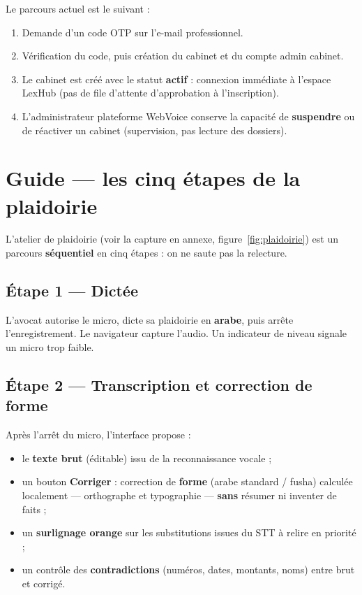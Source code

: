 Le parcours actuel est le suivant :
\begin{enumerate}[leftmargin=1.4em]
  \item Demande d'un code OTP sur l'e-mail professionnel.
  \item Vérification du code, puis création du cabinet et du compte admin cabinet.
  \item Le cabinet est créé avec le statut \textbf{actif} : connexion immédiate à l'espace LexHub (pas de file d'attente d'approbation à l'inscription).
  \item L'administrateur plateforme WebVoice conserve la capacité de \textbf{suspendre} ou de réactiver un cabinet (supervision, pas lecture des dossiers).
\end{enumerate}

\section{Guide --- les cinq étapes de la plaidoirie}
\label{sec:guide}

L'atelier de plaidoirie (voir la capture en annexe, figure~\ref{fig:plaidoirie}) est un parcours \textbf{séquentiel} en cinq étapes : on ne saute pas la relecture.

\subsection{Étape 1 --- Dictée}
L'avocat autorise le micro, dicte sa plaidoirie en \textbf{arabe}, puis arrête l'enregistrement. Le navigateur capture l'audio. Un indicateur de niveau signale un micro trop faible.

\subsection{Étape 2 --- Transcription et correction de forme}
\label{sec:fusha}

Après l'arrêt du micro, l'interface propose :
\begin{itemize}[leftmargin=1.4em]
  \item le \textbf{texte brut} (éditable) issu de la reconnaissance vocale ;
  \item un bouton \textbf{Corriger} : correction de \textbf{forme} (arabe standard / fusha) calculée localement --- orthographe et typographie --- \textbf{sans} résumer ni inventer de faits ;
  \item un \textbf{surlignage orange} sur les substitutions issues du STT à relire en priorité ;
  \item un contrôle des \textbf{contradictions} (numéros, dates, montants, noms) entre brut et corrigé.
\end{itemize}

